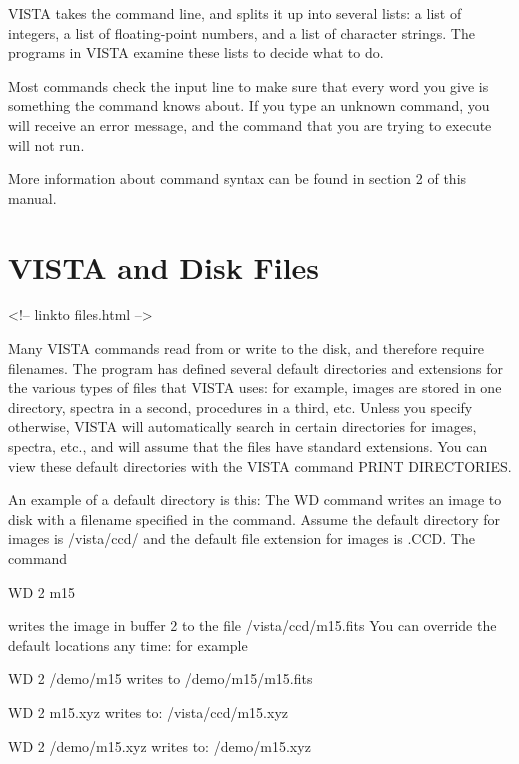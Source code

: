 VISTA takes the command line, and splits it up into several lists: a list
of integers, a list of floating-point numbers, and a list of character
strings.  The programs in VISTA examine these lists to decide what to do.

Most commands check the input line to make sure that every word you give is
something the command knows about.  If you type an unknown command, you
will receive an error message, and the command that you are trying to
execute will not run.

More information about command syntax can be found in section 2 of this
manual.

\section{VISTA and Disk Files}
\begin{rawhtml}
<!-- linkto files.html -->
\end{rawhtml}


Many VISTA commands read from or write to the disk, and therefore require
filenames. The program has defined several default directories and
extensions for the various types of files that VISTA uses: for example,
images are stored in one directory, spectra in a second, procedures in a
third, etc. Unless you specify otherwise, VISTA will automatically search
in certain directories for images, spectra, etc., and will assume that the
files have standard extensions.  You can view these default directories
with the VISTA command PRINT DIRECTORIES.

An example of a default directory is this: The WD command writes an image
to disk with a filename specified in the command.  Assume the default
directory for images is /vista/ccd/ and the default file extension for
images is .CCD.  The command
\begin{example}
   \item[WD 2 m15\hfill]{}
\end{example}
writes the image in buffer 2 to the file /vista/ccd/m15.fits You can
override the default locations any time: for example
\begin{example}
   \item[WD 2 /demo/m15\hfill]{writes to /demo/m15/m15.fits}
   \item[WD 2 m15.xyz\hfill]{writes to: /vista/ccd/m15.xyz}
   \item[WD 2 /demo/m15.xyz\hfill]{writes to: /demo/m15.xyz}
\end{example}

